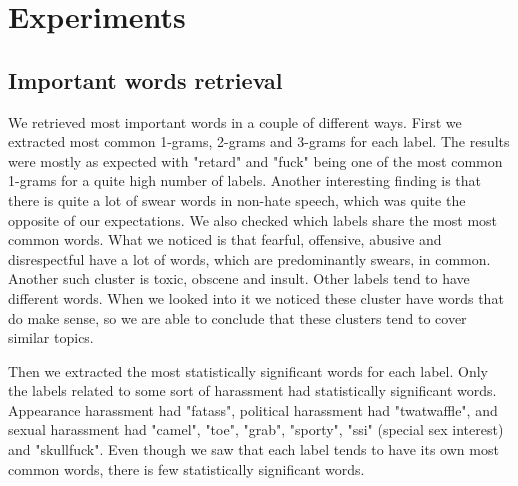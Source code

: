 \documentclass[fleqn,moreauthors,10pt]{ds_report}
\begin{document}
\section*{Experiments}

\subsection*{Important words retrieval}

We retrieved most important words in a couple of different ways. First we extracted most common 1-grams, 2-grams and 3-grams for each label. The results were mostly as expected with "retard" and "fuck" being one of the most common 1-grams for a quite high number of labels. Another interesting finding is that there is quite a lot of swear words in non-hate speech, which was quite the opposite of our expectations. We also checked which labels share the most most common words. What we noticed is that fearful, offensive, abusive and disrespectful have a lot of words, which are predominantly swears, in common. Another such cluster is toxic, obscene and insult. Other labels tend to have different words. When we looked into it we noticed these cluster have words that do make sense, so we are able to conclude that these clusters tend to cover similar topics.

Then we extracted the most statistically significant words for each label. Only the labels related to some sort of harassment had statistically significant words. Appearance harassment had "fatass", political harassment had "twatwaffle", and sexual harassment had "camel", "toe", "grab", "sporty", "ssi" (special sex interest) and "skullfuck". Even though we saw that each label tends to have its own most common words, there is few statistically significant words.

\end{document}

